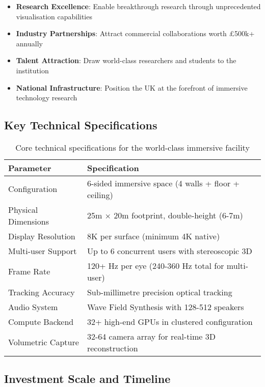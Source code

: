 \begin{itemize}
    \item \textbf{Research Excellence}: Enable breakthrough research through unprecedented visualisation capabilities
    \item \textbf{Industry Partnerships}: Attract commercial collaborations worth £500k+ annually
    \item \textbf{Talent Attraction}: Draw world-class researchers and students to the institution
    \item \textbf{National Infrastructure}: Position the UK at the forefront of immersive technology research
\end{itemize}

\subsection{Key Technical Specifications}

\begin{table}[h]
\centering
\begin{tabular}{|l|l|}
\hline
\textbf{Parameter} & \textbf{Specification} \\
\hline
Configuration & 6-sided immersive space (4 walls + floor + ceiling) \\
\hline
Physical Dimensions & 25m × 20m footprint, double-height (6-7m) \\
\hline
Display Resolution & 8K per surface (minimum 4K native) \\
\hline
Multi-user Support & Up to 6 concurrent users with stereoscopic 3D \\
\hline
Frame Rate & 120+ Hz per eye (240-360 Hz total for multi-user) \\
\hline
Tracking Accuracy & Sub-millimetre precision optical tracking \\
\hline
Audio System & Wave Field Synthesis with 128-512 speakers \\
\hline
Compute Backend & 32+ high-end GPUs in clustered configuration \\
\hline
Volumetric Capture & 32-64 camera array for real-time 3D reconstruction \\
\hline
\end{tabular}
\caption{Core technical specifications for the world-class immersive facility}
\end{table}

\subsection{Investment Scale and Timeline}

